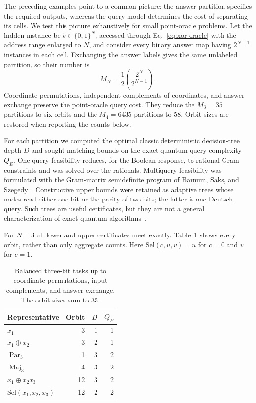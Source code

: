 \documentclass[
  aps,
  prl,
  reprint,
  nofootinbib
]{revtex4-2}
\begin{document}
The preceding examples point to a common picture: the answer partition specifies
the required outputs, whereas the query model determines the cost of separating
its cells. We test this picture exhaustively for small point-oracle problems. Let the hidden instance be
\(b\in\{0,1\}^N\), accessed through Eq.~\eqref{eq:xor-oracle} with the address
range enlarged to \(N\), and consider every binary answer map having
\(2^{N-1}\) instances in each cell. Exchanging the answer labels gives the same
unlabeled partition, so their number is
\begin{equation}
 M_N=\frac12\binom{2^N}{2^{N-1}}.
 \label{eq:balanced-count}
\end{equation}
Coordinate permutations, independent complements of coordinates, and answer
exchange preserve the point-oracle query cost. They reduce the \(M_3=35\)
partitions to six orbits and the \(M_4=6435\) partitions to 58. Orbit sizes are
restored when reporting the counts below.

For each partition we computed the optimal classic deterministic decision-tree depth
\(D\) and sought matching bounds on the exact quantum query complexity
\(Q_E\). One-query feasibility reduces, for the Boolean response, to rational
Gram constraints and was solved over the rationals. Multiquery feasibility was
formulated with the Gram-matrix semidefinite program of
Barnum, Saks, and Szegedy~\cite{BarnumSaksSzegedy2003}. Constructive upper
bounds were retained as adaptive trees whose nodes read either one bit or the
parity of two bits; the latter is one Deutsch query. Such trees are useful
certificates, but they are not a general characterization of exact quantum
algorithms~\cite{MontanaroJozsaMitchison2015}.

For \(N=3\) all lower and upper certificates meet exactly. Table~\ref{tab:n3}
shows every orbit, rather than only aggregate counts. Here
\(\mathrm{Sel}(c,u,v)=u\) for \(c=0\) and \(v\) for \(c=1\).

\begin{table}[t]
\caption{Balanced three-bit tasks up to coordinate permutations, input
complements, and answer exchange. The orbit sizes sum to 35.}
\label{tab:n3}
\begin{ruledtabular}
\begin{tabular}{lrrr}
Representative & Orbit & \(D\) & \(Q_E\)\\
\hline
\(x_1\) & 3 & 1 & 1\\
\(x_1\mathbin\oplus x_2\) & 3 & 2 & 1\\
\(\operatorname{Par}_3\) & 1 & 3 & 2\\
\(\operatorname{Maj}_3\) & 4 & 3 & 2\\
\(x_1\mathbin\oplus x_2x_3\) & 12 & 3 & 2\\
\(\mathrm{Sel}(x_1,x_2,x_3)\) & 12 & 2 & 2\\
\end{tabular}
\end{ruledtabular}
\end{table}
\end{document}
